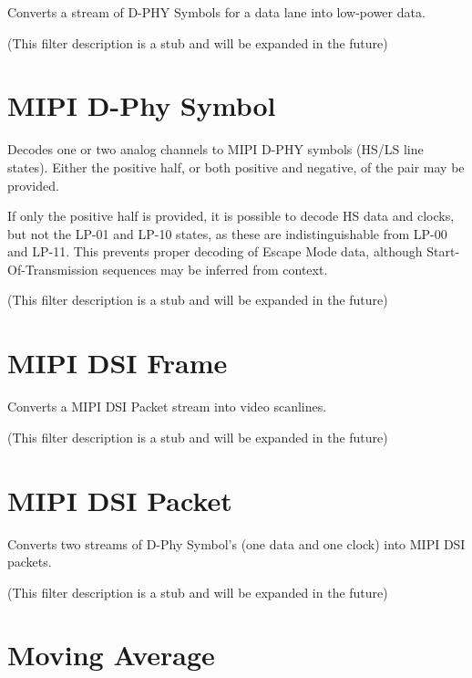 Converts a stream of D-PHY Symbols for a data lane into low-power data.

(This filter description is a stub and will be expanded in the future)

\pagebreak
\section{MIPI D-Phy Symbol}

Decodes one or two analog channels to MIPI D-PHY symbols (HS/LS line states). Either the positive half, or both
positive and negative, of the pair may be provided.

If only the positive half is provided, it is possible to decode HS data and clocks, but not the LP-01 and LP-10 states,
as these are indistinguishable from LP-00 and LP-11. This prevents proper decoding of Escape Mode data, although
Start-Of-Transmission sequences may be inferred from context.

(This filter description is a stub and will be expanded in the future)

\pagebreak
\section{MIPI DSI Frame}

Converts a MIPI DSI Packet stream into video scanlines.

(This filter description is a stub and will be expanded in the future)

\pagebreak
\section{MIPI DSI Packet}

Converts two streams of D-Phy Symbol's (one data and one clock) into MIPI DSI packets.

(This filter description is a stub and will be expanded in the future)

\pagebreak
\section{Moving Average}

